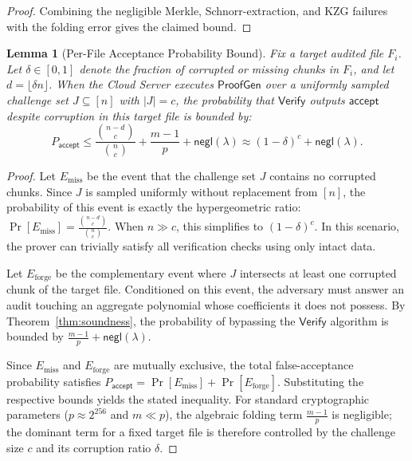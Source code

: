 \documentclass[lettersize,journal]{IEEEtran}
\newtheorem{lemma}{Lemma}
\newcommand{\ProofGen}{\mathsf{ProofGen}}
\newcommand{\Verify}{\mathsf{Verify}}
\begin{document}
\begin{proof}
Combining the negligible Merkle, Schnorr-extraction, and KZG failures with the folding error gives the claimed bound.
\end{proof}

\begin{lemma}[Per-File Acceptance Probability Bound]\label{lem:overall_acceptance}
Fix a target audited file $F_i$. Let $\delta \in [0,1]$ denote the fraction of corrupted or missing chunks in $F_i$, and let $d = \lfloor \delta n \rfloor$. When the Cloud Server executes $\ProofGen$ over a uniformly sampled challenge set $J \subseteq [n]$ with $|J|=c$, the probability that $\Verify$ outputs $\mathsf{accept}$ despite corruption in this target file is bounded by:
\begin{equation}
P_{\mathsf{accept}} \leq \frac{\binom{n-d}{c}}{\binom{n}{c}} + \frac{m-1}{p} + \mathsf{negl}(\lambda) \approx (1-\delta)^c + \mathsf{negl}(\lambda).
\end{equation}
\end{lemma}

\begin{proof}
Let $E_{\text{miss}}$ be the event that the challenge set $J$ contains no corrupted chunks. Since $J$ is sampled uniformly without replacement from $[n]$, the probability of this event is exactly the hypergeometric ratio: $
\Pr[E_{\text{miss}}] = \frac{\binom{n-d}{c}}{\binom{n}{c}}.$
When $n \gg c$, this simplifies to $(1-\delta)^c$. In this scenario, the prover can trivially satisfy all verification checks using only intact data.

Let $E_{\text{forge}}$ be the complementary event where $J$ intersects at least one corrupted chunk of the target file. Conditioned on this event, the adversary must answer an audit touching an aggregate polynomial whose coefficients it does not possess. By Theorem~\ref{thm:soundness}, the probability of bypassing the $\Verify$ algorithm is bounded by $\frac{m-1}{p} + \mathsf{negl}(\lambda)$.

Since $E_{\text{miss}}$ and $E_{\text{forge}}$ are mutually exclusive, the total false-acceptance probability satisfies $P_{\mathsf{accept}} = \Pr[E_{\text{miss}}] + \Pr[E_{\text{forge}}]$. Substituting the respective bounds yields the stated inequality. For standard cryptographic parameters ($p \approx 2^{256}$ and $m \ll p$), the algebraic folding term $\frac{m-1}{p}$ is negligible; the dominant term for a fixed target file is therefore controlled by the challenge size $c$ and its corruption ratio $\delta$.
\end{proof}
\end{document}
